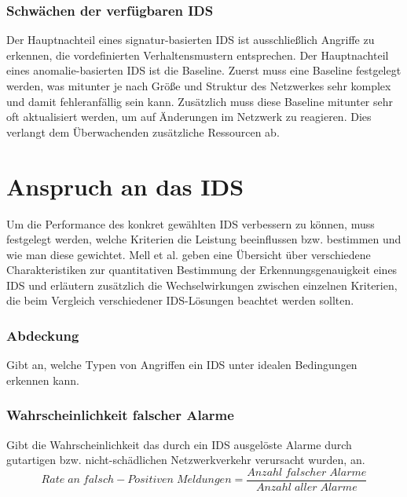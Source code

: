 \subsubsection{Schwächen der verfügbaren IDS}
Der Hauptnachteil eines signatur-basierten IDS ist ausschließlich Angriffe zu erkennen, die vordefinierten Verhaltensmustern entsprechen. Der Hauptnachteil eines anomalie-basierten IDS ist die Baseline. Zuerst muss eine Baseline festgelegt werden, was mitunter je nach Größe und Struktur des Netzwerkes sehr komplex und damit fehleranfällig sein kann. Zusätzlich muss diese Baseline mitunter sehr oft aktualisiert werden, um auf Änderungen im Netzwerk zu reagieren. Dies verlangt dem Überwachenden zusätzliche Ressourcen ab.
\section{Anspruch an das IDS}
Um die Performance des konkret gewählten IDS verbessern zu können, muss festgelegt werden, welche Kriterien die Leistung beeinflussen bzw. bestimmen und wie man diese gewichtet.
Mell et al. \cite{mell2003overview} geben eine Übersicht über verschiedene Charakteristiken zur quantitativen Bestimmung der Erkennungsgenauigkeit eines IDS und erläutern zusätzlich die Wechselwirkungen zwischen einzelnen Kriterien, die beim Vergleich verschiedener IDS-Lösungen beachtet werden sollten.
\subsubsection{Abdeckung}
Gibt an, welche Typen von Angriffen ein IDS unter idealen Bedingungen erkennen kann.
\subsubsection{Wahrscheinlichkeit falscher Alarme}
Gibt die Wahrscheinlichkeit das durch ein IDS ausgelöste Alarme durch gutartigen bzw. nicht-schädlichen Netzwerkverkehr verursacht wurden, an.\\
\[Rate\;an\;falsch-Positiven\;Meldungen = \frac{Anzahl\;falscher\;Alarme}{Anzahl\;aller\;Alarme}\]
